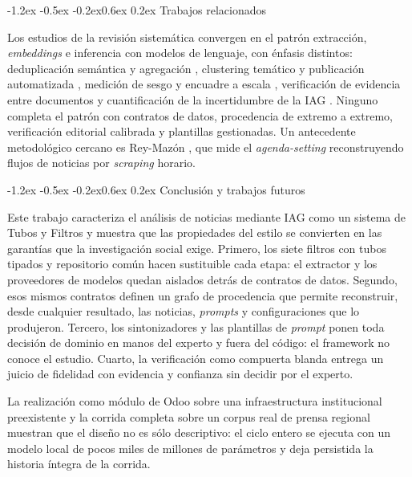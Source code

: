 \documentclass[12pt,a4paper,twocolumn]{article}
\makeatletter
\renewcommand\section{\@startsection{section}{1}{\z@}%
  {-1.2ex \@plus -0.5ex \@minus -0.2ex}{0.6ex \@plus 0.2ex}%
  {\normalfont\normalsize\bfseries}}
\makeatother
\begin{document}
\section{Trabajos relacionados}

Los estudios de la revisión sistemática convergen en el patrón extracción, \textit{embeddings} e inferencia con modelos de lenguaje, con énfasis distintos: deduplicación semántica y agregación \cite{behbahanian}, clustering temático y publicación automatizada \cite{neupane2025}, medición de sesgo y encuadre a escala \cite{haider2025}, verificación de evidencia entre documentos \cite{milbauer2023} y cuantificación de la incertidumbre de la IAG \cite{pavlyshenko2024}. Ninguno completa el patrón con contratos de datos, procedencia de extremo a extremo, verificación editorial calibrada y plantillas gestionadas. Un antecedente metodológico cercano es Rey-Mazón \cite{mazon:2023}, que mide el \textit{agenda-setting} reconstruyendo flujos de noticias por \textit{scraping} horario.

\section{Conclusión y trabajos futuros}

Este trabajo caracteriza el análisis de noticias mediante IAG como un sistema de Tubos y Filtros y muestra que las propiedades del estilo se convierten en las garantías que la investigación social exige. Primero, los siete filtros con tubos tipados y repositorio común hacen sustituible cada etapa: el extractor y los proveedores de modelos quedan aislados detrás de contratos de datos. Segundo, esos mismos contratos definen un grafo de procedencia que permite reconstruir, desde cualquier resultado, las noticias, \textit{prompts} y configuraciones que lo produjeron. Tercero, los sintonizadores y las plantillas de \textit{prompt} ponen toda decisión de dominio en manos del experto y fuera del código: el framework no conoce el estudio. Cuarto, la verificación como compuerta blanda entrega un juicio de fidelidad con evidencia y confianza sin decidir por el experto.

La realización como módulo de Odoo sobre una infraestructura institucional preexistente y la corrida completa sobre un corpus real de prensa regional muestran que el diseño no es sólo descriptivo: el ciclo entero se ejecuta con un modelo local de pocos miles de millones de parámetros y deja persistida la historia íntegra de la corrida.
\end{document}
